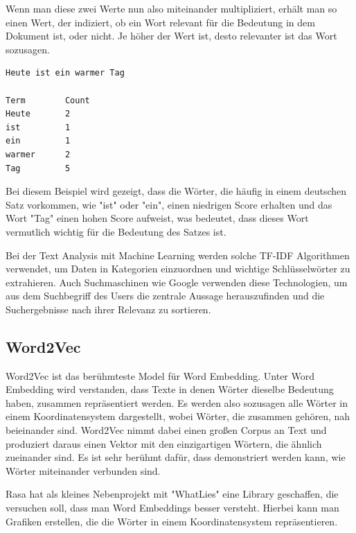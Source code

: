 Wenn man diese zwei Werte nun also miteinander multipliziert, erhält man so einen Wert, der indiziert, ob ein Wort relevant für die Bedeutung in dem Dokument ist, oder nicht.
Je höher der Wert ist, desto relevanter ist das Wort sozusagen.

\begin{lstlisting}[label={lst: TF-IDF Beispiel}]
Heute ist ein warmer Tag

Term        Count
Heute       2
ist         1
ein         1
warmer      2
Tag         5
\end{lstlisting}

Bei diesem Beispiel wird gezeigt, dass die Wörter, die häufig in einem deutschen Satz vorkommen, wie "ist" oder "ein", einen niedrigen Score erhalten und das Wort "Tag" einen hohen Score aufweist, was bedeutet, dass dieses Wort vermutlich wichtig für die Bedeutung des Satzes ist.

Bei der Text Analysis mit Machine Learning werden solche TF-IDF Algorithmen verwendet, um Daten in Kategorien einzuordnen und wichtige Schlüsselwörter zu extrahieren.
Auch Suchmaschinen wie Google verwenden diese Technologien, um aus dem Suchbegriff des Users die zentrale Aussage herauszufinden und die Suchergebnisse nach ihrer Relevanz zu sortieren.\cite{tfIdf}

\subsection{Word2Vec}

Word2Vec ist das berühmteste Model für Word Embedding.
Unter Word Embedding wird verstanden, dass Texte in denen Wörter dieselbe Bedeutung haben, zusammen repräsentiert werden.
Es werden also sozusagen alle Wörter in einem Koordinatensystem dargestellt, wobei Wörter, die zusammen gehören, nah beieinander sind.
Word2Vec nimmt dabei einen großen Corpus an Text und produziert daraus einen Vektor mit den einzigartigen Wörtern, die ähnlich zueinander sind.
Es ist sehr berühmt dafür, dass demonstriert werden kann, wie Wörter miteinander verbunden sind.

Rasa hat als kleines Nebenprojekt mit "WhatLies" eine Library geschaffen, die versuchen soll, dass man Word Embeddings besser versteht.
Hierbei kann man Grafiken erstellen, die die Wörter in einem Koordinatensystem repräsentieren.\cite{whatlies}

